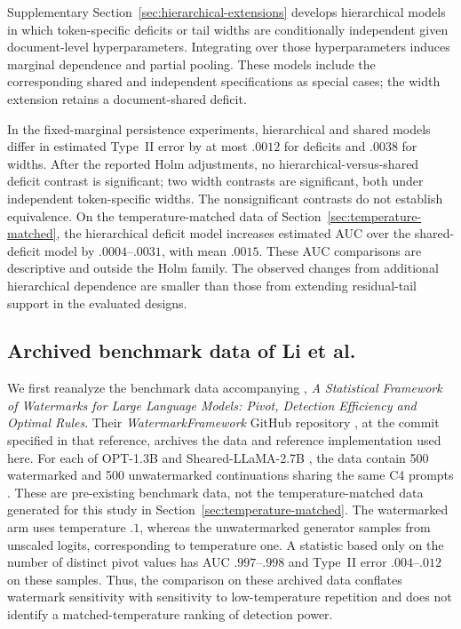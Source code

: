 \documentclass[11pt]{article}
\begin{document}
Supplementary Section~\ref{sec:hierarchical-extensions} develops hierarchical
models in which token-specific deficits or tail widths are conditionally
independent given document-level hyperparameters.  Integrating over those
hyperparameters induces marginal dependence and partial pooling.  These models
include the corresponding shared and independent specifications as special
cases; the width extension retains a document-shared deficit.

In the fixed-marginal persistence experiments, hierarchical and shared models
differ in estimated Type~II error by at most $.0012$ for deficits and $.0038$
for widths.  After the reported Holm adjustments, no hierarchical-versus-shared
deficit contrast is significant; two width contrasts are significant, both
under independent token-specific widths.  The nonsignificant contrasts do not
establish equivalence.  On the temperature-matched data of
Section~\ref{sec:temperature-matched}, the hierarchical deficit model increases
estimated AUC over the shared-deficit model by $.0004$--$.0031$, with mean
$.0015$.  These AUC comparisons are descriptive and outside the Holm family.
The observed changes from additional hierarchical dependence are smaller than
those from extending residual-tail support in the evaluated designs.

\FloatBarrier
\subsection{Archived benchmark data of Li et al.}
\label{sec:released-output}

We first reanalyze the benchmark data accompanying \citet{li2025framework},
\emph{A Statistical Framework of Watermarks for Large Language Models:
Pivot, Detection Efficiency and Optimal Rules}.  Their \emph{WatermarkFramework}
GitHub repository \citep{li2024watermarkframework}, at the commit specified in
that reference, archives the data and reference implementation used here.
For each of OPT-1.3B \citep{zhang2022opt} and Sheared-LLaMA-2.7B
\citep{xia2023sheared}, the data contain 500 watermarked and 500 unwatermarked
continuations sharing the same C4 prompts \citep{raffel2020exploring}.
These are pre-existing benchmark data, not the temperature-matched data
generated for this study in Section~\ref{sec:temperature-matched}.
The watermarked arm uses temperature $.1$, whereas
the unwatermarked generator samples from unscaled logits, corresponding to
temperature one.  A statistic based only on the number of distinct pivot values
has AUC $.997$--$.998$ and Type~II error $.004$--$.012$ on these samples.
Thus, the comparison on these archived data conflates watermark sensitivity with sensitivity
to low-temperature repetition and does not identify a matched-temperature
ranking of detection power.
\end{document}
